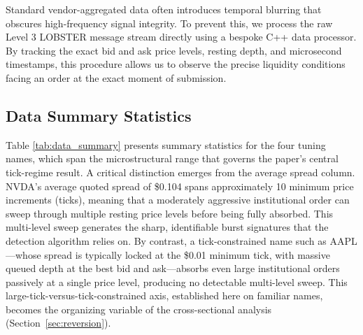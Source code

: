 \documentclass[11pt]{article}
\begin{document}
Standard vendor-aggregated data often introduces temporal blurring that obscures high-frequency signal integrity. To prevent this, we process the raw Level 3 LOBSTER message stream directly using a bespoke C++ data processor. By tracking the exact bid and ask price levels, resting depth, and microsecond timestamps, this procedure allows us to observe the precise liquidity conditions facing an order at the exact moment of submission.

\subsection{Data Summary Statistics}
Table \ref{tab:data_summary} presents summary statistics for the four tuning names, which span the microstructural range that governs the paper's central tick-regime result. A critical distinction emerges from the average spread column. NVDA's average quoted spread of \$0.104 spans approximately 10 minimum price increments (ticks), meaning that a moderately aggressive institutional order can sweep through multiple resting price levels before being fully absorbed. This multi-level sweep generates the sharp, identifiable burst signatures that the detection algorithm relies on. By contrast, a tick-constrained name such as AAPL---whose spread is typically locked at the \$0.01 minimum tick, with massive queued depth at the best bid and ask---absorbs even large institutional orders passively at a single price level, producing no detectable multi-level sweep. This large-tick-versus-tick-constrained axis, established here on familiar names, becomes the organizing variable of the cross-sectional analysis (Section~\ref{sec:reversion}).
\end{document}
